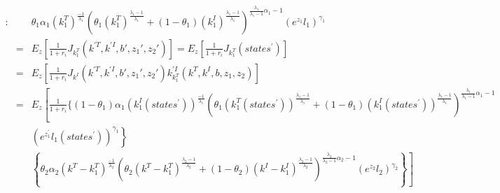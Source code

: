 \documentclass{article}
\begin{document}
\begin{eqnarray}
     [k_1^T]: & &                                                  \theta_1 \alpha_1 (k_{1}^T)^{\frac{-1}{\lambda_1}} \left( \theta_1 (k_{1}^T)^{\frac{\lambda_1-1}{\lambda_1}} +(1-\theta_1)(k_{1}^I)^{\frac{\lambda_1-1}{\lambda_1}} \right)^{\frac{\lambda_1}{\lambda_1-1}\alpha_1-1} \left( e^{z_{1}}l_{1} \right)^{\gamma_1}   \nonumber \\
     & = &  E_z\left[\frac{1}{1+r_i} J_{k_1^T}(k^{\prime T},k^{\prime I},b{\prime},z_{1}{\prime },z_{2}{\prime})   \right] = E_z\left[\frac{1}{1+r_i} J_{k_1^T}(states^\prime)   \right] \nonumber \\
     & = &  E_z\left[\frac{1}{1+r_i} J_{k^I}(k^{\prime T},k^{\prime I},b{\prime},z_{1}{\prime },z_{2}{\prime}) k_{k_1^T}^{\prime I}(k^{ T},k^{ I},b,z_{1},z_{2})  \right] \nonumber \\
     & = &  E_z \left[ \frac{1}{1+r_i} \{ (1-\theta_1) \alpha_1 (k_{1}^I(states^\prime) )^{\frac{-1}{\lambda_1}}    \left( \theta_1 (k_{1}^T(states^\prime) )^{\frac{\lambda_1-1}{\lambda_1}} +(1-\theta_1)(k_{1}^I(states^\prime) )^{\frac{\lambda_1-1}{\lambda_1}} \right)^{\frac{\lambda_1}{\lambda_1-1}\alpha_1-1} \right. \nonumber \\
     &  &  \left.  \left( e^{z_{1}^\prime}l_{1}(states^\prime) \right)^{\gamma_1}  \right\rbrace    \nonumber \\
     &  &  \left.  \left\lbrace \theta_2 \alpha_2 (k^T - k_{1}^T)^{\frac{-1}{\lambda_2}} \left( \theta_2 (k^T - k_{1}^T)^{\frac{\lambda_2-1}{\lambda_2}} +(1-\theta_2)(k^I - k_{1}^I)^{\frac{\lambda_2-1}{\lambda_2}} \right)^{\frac{\lambda_2}{\lambda_2-1}\alpha_2-1} \left( e^{z_{2}}l_{2} \right)^{\gamma_2} \right\rbrace  \right]
\end{eqnarray}
\end{document}

